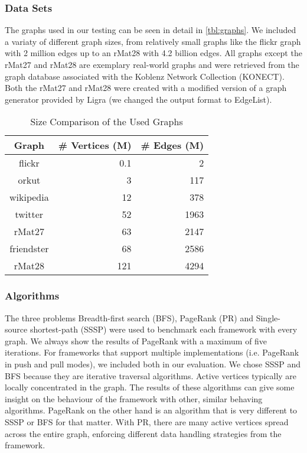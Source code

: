 \subsubsection{Data Sets}
The graphs used in our testing can be seen in detail in \autoref{tbl:graphs}. We included a variaty of different graph sizes, from relatively small graphs like the flickr graph with 2 million edges up to an rMat28 with 4.2 billion edges. All graphs except the rMat27 and rMat28 are exemplary real-world graphs and were retrieved from the graph database associated with the Koblenz Network Collection (KONECT)\cite{konect}.
Both the rMat27 and rMat28 were created with a modified version of a graph generator provided by Ligra (we changed the output format to EdgeList).
\begin{table}
	\centering
	\caption{Size Comparison of the Used Graphs}
	\begin{tabular}{crr}
		\hline
		\bf{Graph}&\# Vertices (M)&\# Edges (M)\\\hline
		flickr&    		0.1&  2\\
		orkut&          3&    117\\
		wikipedia&      12&   378\\
		twitter&     	52&   1963\\
		rMat27&         63&   2147\\
		friendster&     68&   2586\\
		rMat28&         121&  4294\\
		\hline
	\end{tabular}
	\label{tbl:graphs}
\end{table}

\subsubsection{Algorithms}
The three problems Breadth-first search (BFS), PageRank (PR) and Single-source shortest-path (SSSP) were used to benchmark each framework with every graph.
We always show the results of PageRank with a maximum of five iterations.
For frameworks that support multiple implementations (i.e. PageRank in push and pull modes), we included both in our evaluation.
We chose SSSP and BFS because they are iterative traversal algorithms. Active vertices typically are locally concentrated in the graph. The results of these algorithms can give some insight on the behaviour of the framework with other, similar behaving algorithms.
PageRank on the other hand is an algorithm that is very different to SSSP or BFS for that matter. With PR, there are many active vertices spread across the entire graph, enforcing different data handling strategies from the framework.

